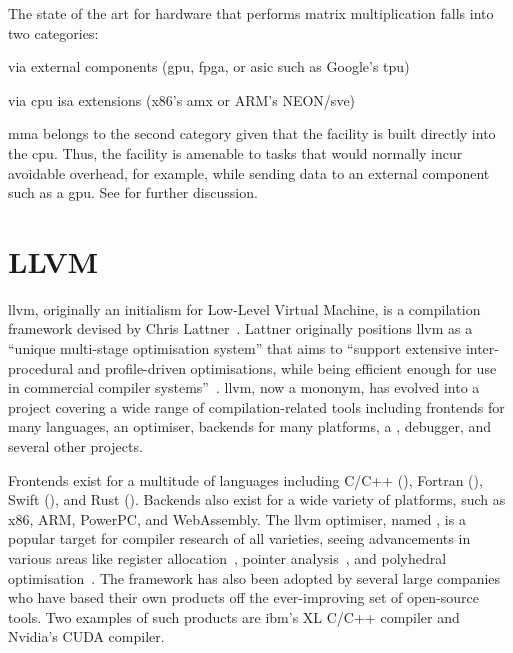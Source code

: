 \documentclass[\main/thesis.tex]{subfiles}
\begin{document}
The state of the art for hardware that performs matrix multiplication falls into two categories:
\begin{enumerate*}[itemjoin*={{ and }}, label=\textbf{(\arabic*)}, after={.}]
  \item via external components (\eg \gls{gpu}, \gls{fpga}, or \gls{asic} such as Google's \gls{tpu})
  \item via \gls{cpu} \gls{isa} extensions (\eg x86's \gls{amx} or ARM's NEON/\gls{sve})
\end{enumerate*}
\Gls{mma} belongs to the second category given that the facility is built directly into the \gls{cpu}.
Thus, the facility is amenable to tasks that would normally incur avoidable overhead, for example, while sending data to an external component such as a \gls{gpu}.
See  for further discussion.

\section{LLVM}
\label{sec:llvm}
\Gls{llvm}, originally an initialism for Low-Level Virtual Machine, is a compilation framework devised by Chris Lattner~\autocite{lattner2002llvm,lattner2004llvm}.
Lattner originally positions \gls{llvm} as a ``unique multi-stage optimisation system'' that aims to ``support extensive inter-procedural and profile-driven optimisations, while being efficient enough for use in commercial compiler systems''~\autocite{lattner2002llvm}.
\Gls{llvm}, now a mononym, has evolved into a project covering a wide range of compilation-related tools including frontends for many languages, an optimiser, backends for many platforms, a , debugger, and several other projects.

Frontends exist for a multitude of languages including C/C++ (), Fortran (), Swift (), and Rust ().
Backends also exist for a wide variety of platforms, such as x86, ARM, PowerPC, and WebAssembly.
The \gls{llvm} optimiser, named , is a popular target for compiler research of all varieties, seeing advancements in various areas like register allocation~\autocite{lozano2019combinatorial,pereira2008register}, pointer analysis~\autocite{hardekopf2009semi,sui2016interprocedural}, and polyhedral optimisation~\autocite{grosser2011polly,alves2015runtime}.
The framework has also been adopted by several large companies who have based their own products off the ever-improving set of open-source tools.
Two examples of such products are \gls{ibm}'s XL C/C++ compiler and Nvidia's CUDA compiler.
\end{document}
